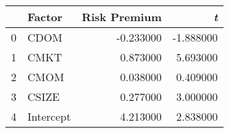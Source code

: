 \begin{tabular}{llrr}
\toprule
 & Factor & Risk Premium & \emph{t} \\
\midrule
0 & CDOM & -0.233000 & -1.888000 \\
1 & CMKT & 0.873000 & 5.693000 \\
2 & CMOM & 0.038000 & 0.409000 \\
3 & CSIZE & 0.277000 & 3.000000 \\
4 & Intercept & 4.213000 & 2.838000 \\
\bottomrule
\end{tabular}
